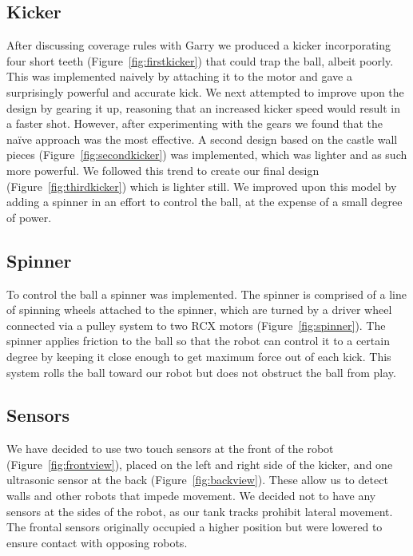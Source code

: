 \documentclass[12pt, a4paper, titlepage]{article}
\begin{document}
\subsection{Kicker}

After discussing coverage rules with Garry we produced a kicker incorporating
four short teeth (Figure~\ref{fig:firstkicker}) that could trap the ball, albeit
poorly. This was implemented naively by attaching it to the motor and gave a
surprisingly powerful and accurate kick. We next attempted to improve upon the
design by gearing it up, reasoning that an increased kicker speed would result
in a faster shot. However, after experimenting with the gears we found that the
naïve approach was the most effective. A second design based on the castle
wall pieces (Figure~\ref{fig:secondkicker}) was implemented, which was lighter
and as such more powerful. We followed this trend to create our final design
(Figure~\ref{fig:thirdkicker}) which is lighter still. We improved upon this
model by adding a spinner in an effort to control the ball, at the expense of a
small degree of power.

\subsection{Spinner}

To control the ball a spinner was implemented. The spinner is comprised
of a line of spinning wheels attached to the spinner, which are turned
by a driver wheel connected via a pulley system to two RCX motors
(Figure~\ref{fig:spinner}). The spinner applies friction to the ball so that
the robot can control it to a certain degree by keeping it close enough to get
maximum force out of each kick. This system rolls the ball toward our robot but
does not obstruct the ball from play.

\subsection{Sensors}

We have decided to use two touch sensors at the front of the robot
(Figure~\ref{fig:frontview}), placed on the left and right side of the kicker,
and one ultrasonic sensor at the back (Figure~\ref{fig:backview}). These allow
us to detect walls and other robots that impede movement. We decided not to
have any sensors at the sides of the robot, as our tank tracks prohibit lateral
movement. The frontal sensors originally occupied a higher position but were
lowered to ensure contact with opposing robots.
\end{document}
